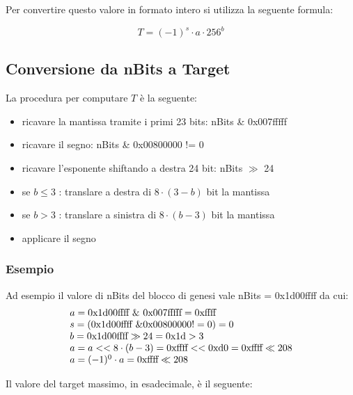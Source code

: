 \documentclass{article}
\begin{document}
Per convertire questo valore in formato intero si utilizza la seguente formula:

\begin{equation}
    T = (-1)^{s} \cdot a \cdot 256^{b}
\end{equation}

\subsection{Conversione da nBits a Target}

La procedura per computare $T$ è la seguente:

\begin{itemize}
    \item ricavare la mantissa tramite i primi 23 bits: nBits \& 0x007fffff
    \item ricavare il segno: nBits \& 0x00800000 != 0
    \item ricavare l'esponente shiftando a destra 24 bit: nBits $\gg$ 24
    \item se $b \le 3$ : translare a destra di $8 \cdot {(3 - b)}$ bit la mantissa
    \item se $b > 3$ : translare a sinistra di $8 \cdot {(b - 3)}$ bit la mantissa
    \item applicare il segno
\end{itemize}


\subsubsection{Esempio}
Ad esempio il valore di nBits del blocco di genesi vale nBits = 0x1d00ffff da cui:
\begin{equation}
    \begin{array}{ll}
        a = \textnormal{0x1d00ffff} \ \& \ \textnormal{0x007fffff} = \textnormal{0xffff} \\
        s = (\textnormal{0x1d00ffff} \ \& \textnormal{0x00800000} != 0) = 0 \\
        b = \textnormal{0x1d00ffff} \gg 24 = \textnormal{0x1d} > 3\\
        a = a << 8 \cdot (b - 3) = \textnormal{0xffff} << \textnormal{0xd0} = \textnormal{0xffff} \ll 208 \\
        a = (-1)^0 \cdot a =  \textnormal{0xffff} \ll 208
    \end{array}
\end{equation}

Il valore del target massimo, in esadecimale, è il seguente:
\end{document}
